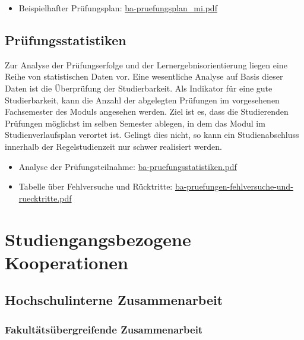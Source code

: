 \begin{itemize}
\tightlist
\item
  Beispielhafter Prüfungsplan:
  \href{https://th-koeln.github.io/mi-2017/anhaenge/ba-pruefungsplan_mi.pdf}{ba-pruefungsplan\_mi.pdf}
\end{itemize}

\section{Prüfungsstatistiken}\label{pruxfcfungsstatistiken}

Zur Analyse der Prüfungserfolge und der Lernergebnisorientierung liegen
eine Reihe von statistischen Daten vor. Eine wesentliche Analyse auf
Basis dieser Daten ist die Überprüfung der Studierbarkeit. Als Indikator
für eine gute Studierbarkeit, kann die Anzahl der abgelegten Prüfungen
im vorgesehenen Fachsemester des Moduls angesehen werden. Ziel ist es,
dass die Studierenden Prüfungen möglichst im selben Semester ablegen, in
dem das Modul im Studienverlaufsplan verortet ist. Gelingt dies nicht,
so kann ein Studienabschluss innerhalb der Regelstudienzeit nur schwer
realisiert werden.

\begin{itemize}
\tightlist
\item
  Analyse der Prüfungsteilnahme:
  \href{https://th-koeln.github.io/mi-2017/anhaenge/ba-pruefungsplan_mi.pdf}{ba-pruefungsstatistiken.pdf}
\item
  Tabelle über Fehlversuche und Rücktritte:
  \href{https://th-koeln.github.io/mi-2017/anhaenge/ba-pruefungen-fehlversuche-und-ruecktritte.pdf}{ba-pruefungen-fehlversuche-und-ruecktritte.pdf}
\end{itemize}

\chapter{Studiengangsbezogene
Kooperationen}\label{studiengangsbezogene-kooperationen}

\section{Hochschulinterne
Zusammenarbeit}\label{hochschulinterne-zusammenarbeit}

\subsection{Fakultätsübergreifende
Zusammenarbeit}\label{fakultuxe4tsuxfcbergreifende-zusammenarbeit}

